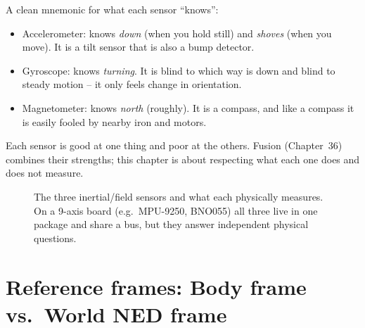 \begin{intuitionbox}
A clean mnemonic for what each sensor ``knows'':
\begin{itemize}
\item Accelerometer: knows \emph{down} (when you hold still) and \emph{shoves} (when
  you move). It is a tilt sensor that is also a bump detector.
\item Gyroscope: knows \emph{turning}. It is blind to which way is down and blind to
  steady motion -- it only feels change in orientation.
\item Magnetometer: knows \emph{north} (roughly). It is a compass, and like a compass
  it is easily fooled by nearby iron and motors.
\end{itemize}
Each sensor is good at one thing and poor at the others. Fusion
(Chapter~36) combines their strengths; this chapter is about
respecting what each one does and does not measure.
\end{intuitionbox}

\begin{figure}[H]
\centering
{}
\caption{The three inertial/field sensors and what each physically measures. On a
9-axis board (e.g.\ MPU-9250, BNO055) all three live in one package and share a
bus, but they answer independent physical questions.}
\label{ch34:fig-overview}
\end{figure}

\section{Reference frames: Body frame vs.\ World NED frame}
\label{ch34:frames}

